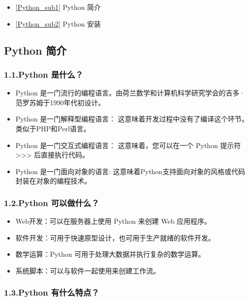 
\begin{itemize}
\item \autoref{Python_sub1} Python 简介
\item \autoref{Python_sub2} Python 安装
\end{itemize}

\subsection{Python 简介}\label{Python_sub1}

\subsubsection{1.1.Python 是什么？}

\begin{itemize}
\item Python 是一门流行的编程语言。由荷兰数学和计算机科学研究学会的吉多·范罗苏姆于1990年代初设计。
\item Python 是一门解释型编程语言： 这意味着开发过程中没有了编译这个环节。类似于PHP和Perl语言。
\item Python 是一门交互式编程语言： 这意味着，您可以在一个 Python 提示符 >>> 后直接执行代码。
\item Python 是一门面向对象的语言: 这意味着Python支持面向对象的风格或代码封装在对象的编程技术。
\end{itemize}
 
\subsubsection{1.2.Python 可以做什么？}
\begin{itemize}
\item Web开发：可以在服务器上使用 Python 来创建 Web 应用程序。
\item 软件开发：可用于快速原型设计，也可用于生产就绪的软件开发。
\item 数学运算：Python 可用于处理大数据并执行复杂的数学运算。
\item 系统脚本：可以与软件一起使用来创建工作流。
\end{itemize}

\subsubsection{1.3.Python 有什么特点？}

